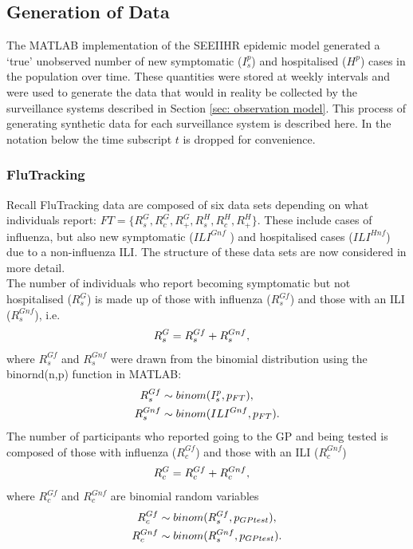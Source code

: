 \subsection{Generation of Data}
The MATLAB implementation of the SEEIIHR epidemic model generated a `true' unobserved number of new symptomatic ($I_s^p$) and hospitalised ($H^p$) cases in the population over time. These quantities were stored at weekly intervals and were used to generate the data that would in reality be collected by the surveillance systems described in Section \ref{sec: observation model}. This process of generating synthetic data for each surveillance system is described here. In the notation below the time subscript $t$ is dropped for convenience.

\subsubsection{FluTracking}
Recall FluTracking data are composed of six data sets depending on what individuals report: $FT = \{R_{s}^G,R_{c}^G,R_{+}^G,R_{s}^H,R_{c}^H,R_{+}^H\}$. These include cases of influenza, but also new symptomatic ($ILI^{Gnf}$ ) and hospitalised cases ($ILI^{Hnf}$) due to a non-influenza ILI. The structure of these data sets are now considered in more detail.\\
The number of individuals who report becoming symptomatic but not hospitalised ($R_{s}^G$) is made up of those with influenza ($R_{s}^{Gf}$) and those with an ILI ($R_{s}^{Gnf}$), i.e.
\begin{align} \notag
R_{s}^{G} &= R_{s}^{Gf} + R_{s}^{Gnf},
\end{align}
where $R_{s}^{Gf}$ and $R_{s}^{Gnf}$ were drawn from the binomial distribution using the binornd(n,p) function in MATLAB:
\begin{align} \notag
R_{s}^{Gf} &\sim binom(I_{s}^p,p_{FT}), \\ \notag
R_{s}^{Gnf} &\sim binom(ILI^{Gnf},p_{FT}).
\end{align}
The number of participants who reported going to the GP and being tested is composed of those with influenza ($R_{c}^{Gf}$) and those with an ILI ($R_{c}^{Gnf}$)
\begin{align} \notag
	R_{c}^{G} &= R_{c}^{Gf} + R_{c}^{Gnf},
\end{align}
where $R_{c}^{Gf}$ and $R_{c}^{Gnf}$ are binomial random variables
\begin{align} \notag
	R_{c}^{Gf} &\sim binom(R_{s}^{Gf},p_{GPtest}), \\ \notag
	R_{c}^{Gnf} &\sim binom(R_{s}^{Gnf},p_{GPtest}).
\end{align}
